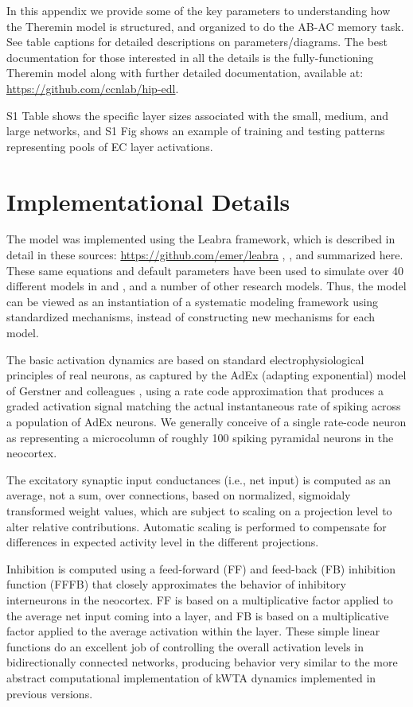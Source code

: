 \documentclass[10pt,letterpaper]{article}
\begin{document}
In this appendix we provide some of the key parameters to understanding how the Theremin model is structured, and organized to do the AB-AC memory task.  See table captions for detailed descriptions on parameters/diagrams.  The best documentation for those interested in all the details is the fully-functioning Theremin model along with further detailed documentation, available at: \url{https://github.com/ccnlab/hip-edl}.   

S1 Table shows the specific layer sizes associated with the small, medium, and large networks, and S1 Fig shows an example of training and testing patterns representing pools of EC layer activations.

\section{Implementational Details}

The model was implemented using the Leabra framework, which is described in detail in these sources: \url{https://github.com/emer/leabra} \cite{OReillyMunakataFrankEtAl12}, \cite{OReillyMunakata00}, and summarized here.  These same equations and default parameters have been used to simulate over 40 different models in \cite{OReillyMunakataFrankEtAl12} and \cite{OReillyMunakata00}, and a number of other research models.  Thus, the model can be viewed as an instantiation of a systematic modeling framework using standardized mechanisms, instead of constructing new mechanisms for each model.

The basic activation dynamics are based on standard electrophysiological principles of real neurons, as captured by the AdEx (adapting exponential) model of Gerstner and colleagues \cite{BretteGerstner05}, using a rate code approximation that produces a graded activation signal matching the actual instantaneous rate of spiking across a population of AdEx neurons.  We generally conceive of a single rate-code neuron as representing a microcolumn of roughly 100 spiking pyramidal neurons in the neocortex.
 
The excitatory synaptic input conductances (i.e., net input) is computed as an average, not a sum, over connections, based on normalized, sigmoidaly transformed weight values, which are subject to scaling on a projection level to alter relative contributions. Automatic scaling is performed to compensate for differences in expected activity level in the different projections.

Inhibition is computed using a feed-forward (FF) and feed-back (FB) inhibition function (FFFB) that closely approximates the behavior of inhibitory interneurons in the neocortex. FF is based on a multiplicative factor applied to the average net input coming into a layer, and FB is based on a multiplicative factor applied to the average activation within the layer. These simple linear functions do an excellent job of controlling the overall activation levels in bidirectionally connected networks, producing behavior very similar to the more abstract computational implementation of kWTA dynamics implemented in previous versions.
\end{document}
